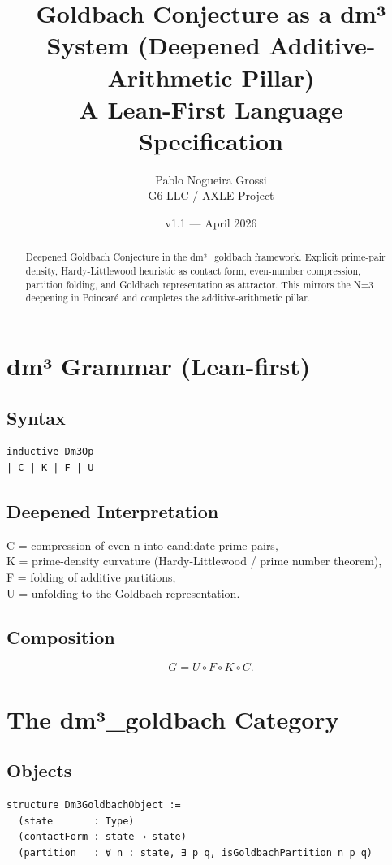 \documentclass[11pt,a4paper]{article}
\title{\textbf{Goldbach Conjecture as a dm³ System (Deepened Additive-Arithmetic Pillar)}\\
A Lean-First Language Specification}
\author{Pablo Nogueira Grossi \\ G6 LLC / AXLE Project}
\date{v1.1 — April 2026}
\begin{document}
\maketitle

\begin{abstract}
Deepened Goldbach Conjecture in the dm³\_goldbach framework.
Explicit prime-pair density, Hardy-Littlewood heuristic as contact form,
even-number compression, partition folding, and Goldbach representation as attractor.
This mirrors the N=3 deepening in Poincaré and completes the additive-arithmetic pillar.
\end{abstract}

\section{dm³ Grammar (Lean-first)}

\subsection{Syntax}
\begin{lstlisting}
inductive Dm3Op
| C | K | F | U
\end{lstlisting}

\subsection{Deepened Interpretation}
C = compression of even n into candidate prime pairs, \\
K = prime-density curvature (Hardy-Littlewood / prime number theorem), \\
F = folding of additive partitions, \\
U = unfolding to the Goldbach representation.

\subsection{Composition}
\[
G = U \circ F \circ K \circ C.
\]

\section{The dm³\_goldbach Category}

\subsection{Objects}
\begin{lstlisting}
structure Dm3GoldbachObject :=
  (state       : Type)
  (contactForm : state → state)
  (partition   : ∀ n : state, ∃ p q, isGoldbachPartition n p q)
\end{lstlisting}
\end{document}
